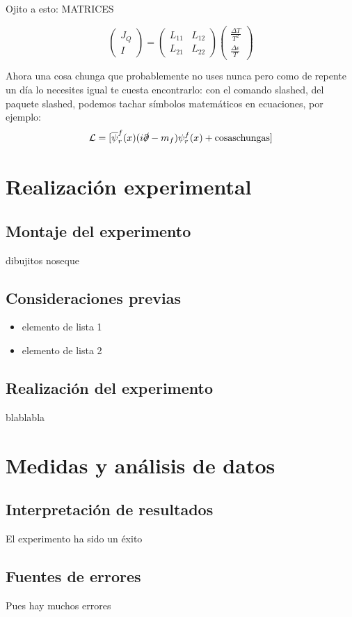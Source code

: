 \documentclass[12pt,a4paper]{article}
\begin{document}
\begin{multicols}{2}
Ojito a esto: MATRICES

\begin{equation*}
\begin{pmatrix}
J_Q\\
I
\end{pmatrix}
=
\begin{pmatrix}
L_{11} & L_{12}\\
L_{21} & L_{22}
\end{pmatrix}
\begin{pmatrix}
\frac{\Delta T}{T^2}\\
\frac{\Delta \epsilon}{T}
\end{pmatrix}
\end{equation*}


Ahora una cosa chunga que probablemente no uses nunca pero como de repente un día lo necesites igual te cuesta encontrarlo: con el comando slashed, del paquete slashed, podemos tachar símbolos matemáticos en ecuaciones, por ejemplo:
\begin{equation*}
\mathcal{L}=[\overline{\psi}_r^f(x)(i\slashed\partial-m_f)\psi_r^f(x)+\text{cosaschungas}]
\end{equation*}

\section{Realización experimental}
\subsection{Montaje del experimento}
dibujitos noseque

\subsection{Consideraciones previas}
\label{consideraciones}
\begin{itemize}
\item elemento de lista 1
\item elemento de lista 2
\end{itemize}

\subsection{Realización del experimento}
blablabla
\section{Medidas y análisis de datos}
\subsection{Interpretación de resultados}
El experimento ha sido un éxito
\subsection{Fuentes de errores}
Pues hay muchos errores

\end{multicols} %
\end{document}
